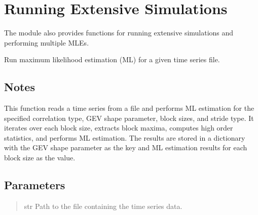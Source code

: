 \documentclass[a4paper,11pt,openany,english]{sphinxmanual}
\begin{document}
\section{Running Extensive Simulations}
\label{\detokenize{api_topt:running-extensive-simulations}}
\sphinxAtStartPar
The  module also provides functions for running extensive simulations and performing multiple MLEs.

\begin{fulllineitems}
\label{\detokenize{api_topt:xtremes.topt.run_ML_estimation}}
\pysigstartsignatures
{}
\pysigstopsignatures
\sphinxAtStartPar
Run maximum likelihood estimation (ML) for a given time series file.


\subsection{Notes}
\label{\detokenize{api_topt:id90}}
\sphinxAtStartPar
This function reads a time series from a file and performs ML estimation for the specified correlation type, GEV shape parameter, block sizes,
and stride type. It iterates over each block size, extracts block maxima, computes high order statistics, and performs ML estimation.
The results are stored in a dictionary with the GEV shape parameter as the key and ML estimation results for each block size as the value.


\subsection{Parameters}
\label{\detokenize{api_topt:id91}}\begin{quote}\begin{description}
\sphinxAtStartPar
str
Path to the file containing the time series data.


\end{description}
\end{quote}
\end{fulllineitems}
\end{document}
